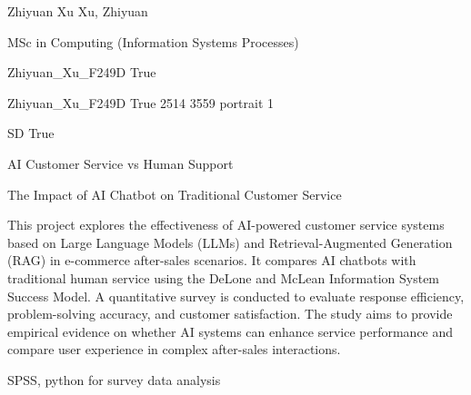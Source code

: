 
\begingroup{}\relax



\def\Key{Zhiyuan_Xu_F249D}

{Zhiyuan Xu}
{Xu, Zhiyuan}

{MSc in Computing (Information Systems Processes)}

{Zhiyuan_Xu_F249D}
{True}

{Zhiyuan_Xu_F249D}
{True}
{2514}
{3559}
{portrait}
{1}

{SD}
{True}

{AI Customer Service vs Human Support}

{The Impact of AI Chatbot on Traditional Customer Service}

{This project explores the effectiveness of AI-powered customer service systems based on Large Language Models (LLMs) and Retrieval-Augmented Generation (RAG) in e-commerce after-sales scenarios. It compares AI chatbots with traditional human service using the DeLone and McLean Information System Success Model. A quantitative survey is conducted to evaluate response efficiency, problem-solving accuracy, and customer satisfaction. The study aims to provide empirical evidence on whether AI systems can enhance service performance and compare user experience in complex after-sales interactions.}

{SPSS, python for survey data analysis}

